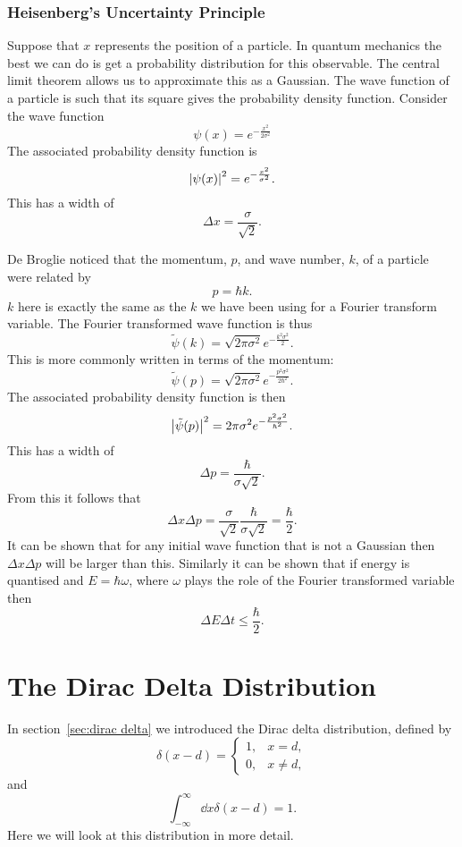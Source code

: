 \documentclass[a4paper]{article}
\begin{document}
    \subsubsection{Heisenberg's Uncertainty Principle}
    Suppose that \(x\) represents the position of a particle.
    In quantum mechanics the best we can do is get a probability distribution for this observable.
    The central limit theorem allows us to approximate this as a Gaussian.
    The wave function of a particle is such that its square gives the probability density function.
    Consider the wave function
    \[\psi(x) = e^{-\frac{x^2}{2\sigma^2}}\]
    The associated probability density function is
    \[\abs{\psi(x)}^2 = e^{-\frac{x^2}{\sigma^2}}.\]
    This has a width of
    \[\Delta x = \frac{\sigma}{\sqrt{2}}.\]
    
    De Broglie noticed that the momentum, \(p\), and wave number, \(k\), of a particle were related by
    \[p = \hbar k.\]
    \(k\) here is exactly the same as the \(k\) we have been using for a Fourier transform variable.
    The Fourier transformed wave function is thus
    \[\tilde{\psi}(k) = \sqrt{2\pi\sigma^2}e^{-\frac{k^2\sigma^2}{2}}.\]
    This is more commonly written in terms of the momentum:
    \[\tilde{\psi}(p) = \sqrt{2\pi\sigma^2} e^{-\frac{p^2\sigma^2}{2\hbar^2}}.\]
    The associated probability density function is then
    \[\abs{\tilde{\psi}(p)}^2 = 2\pi\sigma^2e^{-\frac{p^2\sigma^2}{\hbar^2}}.\]
    This has a width of
    \[\Delta p = \frac{\hbar}{\sigma\sqrt{2}}.\]
    From this it follows that
    \[\Delta x\Delta p = \frac{\sigma}{\sqrt{2}} \frac{\hbar}{\sigma\sqrt{2}} = \frac{\hbar}{2}.\]
    It can be shown that for any initial wave function that is not a Gaussian then \(\Delta x\Delta p\) will be larger than this.
    Similarly it can be shown that if energy is quantised and \(E = \hbar\omega\), where \(\omega\) plays the role of the Fourier transformed variable then
    \[\Delta E\Delta t \le \frac{\hbar}{2}.\]
    
    \section{The Dirac Delta Distribution}
    In section~\ref{sec:dirac delta} we introduced the Dirac delta distribution, defined by
    \[
        \delta(x - d) =
        \begin{cases}
            1, & x = d,\\
            0, & x\ne d,
        \end{cases}
    \]
    and
    \[\int_{-\infty}^{\infty} \dd{x}\delta(x - d) = 1.\]
    Here we will look at this distribution in more detail.
    
\end{document}
